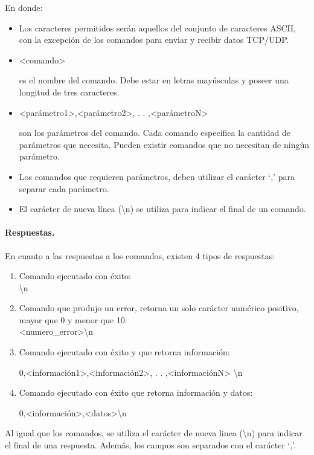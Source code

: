 \documentclass[a4paper,spanish,11pt]{article}
\begin{document}
En donde: 
\begin{itemize}
	\item Los caracteres permitidos serán aquellos del conjunto de caracteres ASCII, con la excepción de los comandos para enviar y recibir datos TCP/UDP.
	\item 
	\begin{ttfamily}
		<comando>
	\end{ttfamily} es el nombre del comando. Debe estar en letras mayúsculas y poseer una longitud de tres caracteres.
	\item \begin{ttfamily}
		<parámetro1>,<parámetro2>, . . ,<parámetroN> 
	\end{ttfamily} son los parámetros del comando. Cada comando especifica la cantidad de parámetros que necesita. Pueden existir comandos que no necesitan de ningún parámetro.
	\item Los comandos que requieren parámetros, deben utilizar el carácter \enquote*{{\ttfamily ,}} para separar cada parámetro.
	\item El carácter de nueva línea ({\ttfamily \textbackslash n}) se utiliza para indicar el final de un comando.  
\end{itemize}

\paragraph{Respuestas.}En cuanto a las respuestas a los comandos, existen 4 tipos de respuestas: 
\begin{enumerate}
	\item	Comando ejecutado con éxito:\\
	{\textbackslash n}
	\item	Comando que produjo un error, retorna un solo carácter numérico positivo, mayor que 0 y menor que 10:\\
	{\ttfamily <numero\_error>\textbackslash n} 
	\item	Comando ejecutado con éxito y que retorna información:\\	\begin{ttfamily} 0,<información1>,<información2>, . . ,<informaciónN> \textbackslash n \end{ttfamily}
	\item   Comando ejecutado con éxito que retorna información y datos:\\ \begin{ttfamily} 0,<información>,<datos>\textbackslash n \end{ttfamily}
\end{enumerate}
Al igual que los comandos, se utiliza el carácter de nueva linea ({\ttfamily \textbackslash n}) para indicar el final de una respuesta. Además, los campos son separados con el carácter \enquote*{{\ttfamily ,}}.
\end{document}
